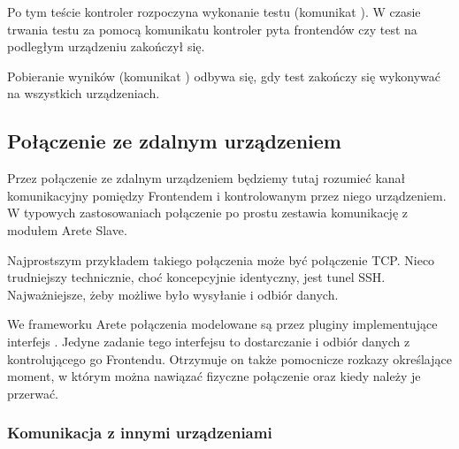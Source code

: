 \documentclass[00-praca-magisterska.tex]{subfiles}
\begin{document}
Po tym teście kontroler rozpoczyna wykonanie testu (komunikat
). W czasie trwania testu za pomocą komunikatu
 kontroler pyta frontendów czy test na podległym
urządzeniu zakończył się.

Pobieranie wyników (komunikat ) odbywa się, gdy test
zakończy się wykonywać na wszystkich urządzeniach.



\subsection{Połączenie ze zdalnym urządzeniem}


Przez połączenie ze zdalnym urządzeniem będziemy tutaj rozumieć kanał
komunikacyjny pomiędzy Frontendem i kontrolowanym przez niego urządzeniem. W
typowych zastosowaniach połączenie po prostu zestawia komunikację z modułem
Arete Slave. 


Najprostszym przykładem takiego połączenia może być połączenie TCP. Nieco
trudniejszy technicznie, choć koncepcyjnie identyczny, jest tunel SSH.
Najważniejsze, żeby możliwe było wysyłanie i odbiór danych.

We frameworku Arete połączenia modelowane są przez pluginy implementujące
interfejs . Jedyne zadanie tego interfejsu to
dostarczanie i odbiór danych z kontrolującego go Frontendu. Otrzymuje on także
pomocnicze rozkazy określające moment, w którym można nawiązać fizyczne
połączenie oraz kiedy należy je przerwać.



\subsubsection{Komunikacja z innymi urządzeniami}

\FIXME{}
\end{document}
